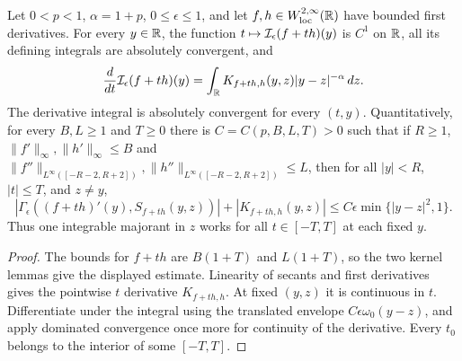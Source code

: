 \begin{lemma}
  \label{lem:c10_parameter_differentiation}
  Let $0<p<1$, $\alpha=1+p$, $0\le\epsilon\le1$, and let $f,h\in W^{2,\infty}_{\mathrm{loc}}(\mathbb{R})$ have bounded
  first derivatives. For every $y\in\mathbb{R}$, the function $t\mapsto\mathcal{I}_\epsilon(f+th)(y)$ is $C^1$ on
  $\mathbb{R}$, all its defining integrals are absolutely convergent, and
  \[
    \frac{d}{dt}\mathcal{I}_\epsilon(f+th)(y)
        =\int_{\mathbb{R}} K_{f+th,h}(y,z)|y-z|^{-\alpha}\,dz.
  \]
  The derivative integral is absolutely convergent for every $(t,y)$.
  Quantitatively, for every $B,L\ge1$ and $T\ge0$ there is $C=C(p,B,L,T)>0$ such that if
  $R\ge1$, $\|f'\|_\infty,\|h'\|_\infty\le B$ and
  $\|f''\|_{L^\infty([-R-2,R+2])},\|h''\|_{L^\infty([-R-2,R+2])}\le L$, then for all
  $|y|<R$, $|t|\le T$, and $z\ne y$,
  \[
    |\Gamma_\epsilon((f+th)'(y),S_{f+th}(y,z))|
       +|K_{f+th,h}(y,z)|\le C\epsilon\min\{|y-z|^2,1\}.
  \]
  Thus one integrable majorant in $z$ works for all $t\in[-T,T]$ at each fixed $y$.
\end{lemma}
\begin{proof}
  The bounds for $f+th$ are $B(1+T)$ and $L(1+T)$, so the two kernel lemmas give the displayed
  estimate. Linearity of secants and first derivatives gives the pointwise $t$ derivative
  $K_{f+th,h}$. At fixed $(y,z)$ it is continuous in $t$. Differentiate under the integral using
  the translated envelope $C\epsilon\omega_0(y-z)$, and apply dominated convergence once more
  for continuity of the derivative. Every $t_0$ belongs to the interior of some $[-T,T]$.
\end{proof}

